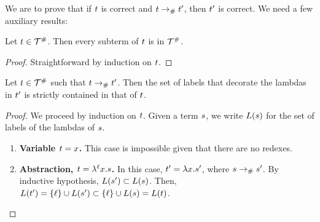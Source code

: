 We are to prove that
if $t$ is correct and $t \mathrel{\to_{\mathtt{\#}}} t'$,
then $t'$ is correct.
We need a few auxiliary results:

\begin{lemma}
Let $t \in \mathcal{T}^{\mathtt{\#}}$. Then every subterm of $t$ is in $\mathcal{T}^{\mathtt{\#}}$.
\end{lemma}
\begin{proof}
Straightforward by induction on $t$.
\end{proof}

\begin{lemma}
Let $t \in \mathcal{T}^{\mathtt{\#}}$ such that $t \mathrel{\to_{\mathtt{\#}}} t'$.
Then the set of labels that decorate the lambdas in $t'$ is strictly contained in that of $t$.
\end{lemma}
\begin{proof}
We proceed by induction on $t$.
Given a term $s$,
we write $L(s)$ for the set of labels of the lambdas of $s$.
\begin{enumerate}
\item {\bf Variable $t = x$.} This case is impossible given that there are no redexes.

\item {\bf Abstraction, $t = \lambda^{\ell} x. s$.}
  In this case, $t' = \lambda x. s'$, where $s \mathrel{\to_{\mathtt{\#}}} s'$.
  By inductive hypothesis, $L(s') \subset L(s)$.
  Then, $L(t') = \{\ell\} \cup L(s') \subset \{\ell\} \cup L(s) = L(t)$.


\end{enumerate}
\end{proof}

